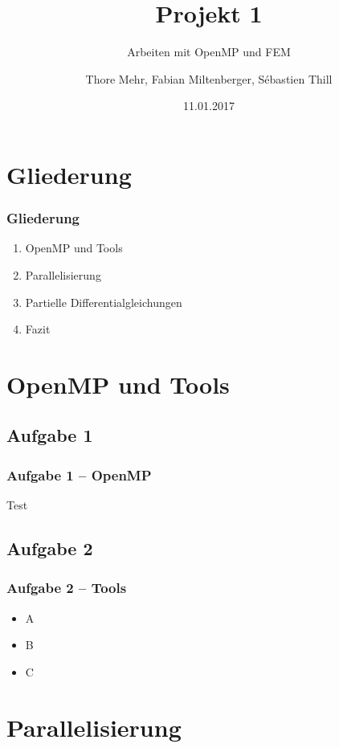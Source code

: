 \documentclass[german,notes,18pt]{beamer}
\title{Projekt 1}
\subtitle{Arbeiten mit OpenMP und FEM}
\author{Thore Mehr, Fabian Miltenberger, Sébastien Thill}
\date{11.01.2017}
\institute{Lehrstuhl für Rechnerarchitektur und Parallelverarbeitung (ITEC)}
\begin{document}
	
	\frame{\titlepage}
	
	\section{Gliederung}
	\begin{frame}
		\frametitle{Gliederung}
		
		\begin{enumerate}
			\item OpenMP und Tools
			\item Parallelisierung
			\item Partielle Differentialgleichungen
			\item Fazit
		\end{enumerate}
	\end{frame}

	\section{OpenMP und Tools}
	\subsection{Aufgabe 1}
	\begin{frame}
		\frametitle{Aufgabe 1 -- OpenMP}
		
		Test
	\end{frame}

	\subsection{Aufgabe 2}
	\begin{frame}
		\frametitle{Aufgabe 2 -- Tools}
		
		\begin{itemize}
			\item A
			\item B
			\item C
		\end{itemize}
	\end{frame}
	
	
	
	\section{Parallelisierung}
\end{document}

